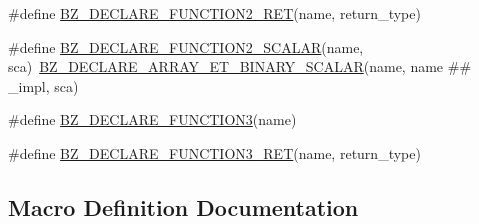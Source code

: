 \begin{DoxyCompactItemize}
\#define \hyperlink{newet-macros_8h_a46712b7da139600f2f175c5ca020be16}{B\+Z\+\_\+\+D\+E\+C\+L\+A\+R\+E\+\_\+\+F\+U\+N\+C\+T\+I\+O\+N2\+\_\+\+R\+E\+T}(name,  return\+\_\+type)
\item 
\#define \hyperlink{newet-macros_8h_a6e46764363cf267a43b8f18708feea75}{B\+Z\+\_\+\+D\+E\+C\+L\+A\+R\+E\+\_\+\+F\+U\+N\+C\+T\+I\+O\+N2\+\_\+\+S\+C\+A\+L\+A\+R}(name,  sca)~\hyperlink{newet-macros_8h_a94fa9d7e168361532eb54e594ad7952b}{B\+Z\+\_\+\+D\+E\+C\+L\+A\+R\+E\+\_\+\+A\+R\+R\+A\+Y\+\_\+\+E\+T\+\_\+\+B\+I\+N\+A\+R\+Y\+\_\+\+S\+C\+A\+L\+A\+R}(name, name \#\# \+\_\+impl, sca)
\item 
\#define \hyperlink{newet-macros_8h_ae068656fadf45983a89e9db33d0096f0}{B\+Z\+\_\+\+D\+E\+C\+L\+A\+R\+E\+\_\+\+F\+U\+N\+C\+T\+I\+O\+N3}(name)
\item 
\#define \hyperlink{newet-macros_8h_a2238b83517e07c907650ab58a68f11da}{B\+Z\+\_\+\+D\+E\+C\+L\+A\+R\+E\+\_\+\+F\+U\+N\+C\+T\+I\+O\+N3\+\_\+\+R\+E\+T}(name,  return\+\_\+type)
\end{DoxyCompactItemize}


\subsection{Macro Definition Documentation}
\hypertarget{newet-macros_8h_a12923c144c4f726564115a6c8f8beb08}{}
